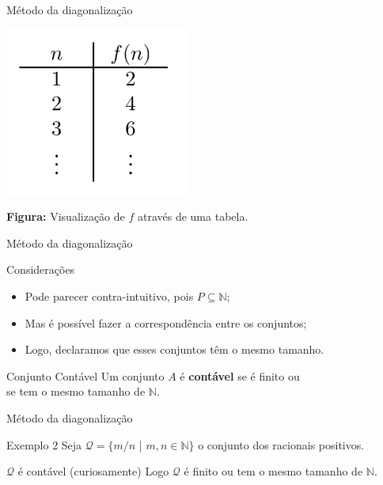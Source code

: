 \documentclass[xcolor=dvipsnames,table]{beamer}
\begin{document}
	\begin{frame}{Método da diagonalização}
		\begin{center}
    		\includegraphics[width=6cm]{images/fn2n.png}
    		
    		{\bf Figura:} Visualização de $f$ através de uma tabela.
  		\end{center}
	\end{frame}
	
	\begin{frame}{Método da diagonalização}
		\begin{block}{Considerações}
			\begin{itemize}
				\item Pode parecer contra-intuitivo, pois $P \subseteq \mathbb{N}$;
				\item Mas é possível fazer a correspondência entre os conjuntos;
				\item Logo, declaramos que esses conjuntos têm o mesmo tamanho.			
			\end{itemize}
		\end{block} 
		\begin{block}{Conjunto Contável}
			Um conjunto $A$ é {\bf contável} se é finito ou \\se tem o mesmo tamanho de $\mathbb{N}$.
		\end{block}
	\end{frame}
	
	\begin{frame}{Método da diagonalização}
		\begin{block}{Exemplo 2}
			Seja $\mathcal{Q} = \{ m / n$ | $m, n \in \mathbb{N} \}$ o conjunto dos racionais positivos.
		\end{block} 
		\begin{block}{$\mathcal{Q}$ é contável (curiosamente)} 
			Logo $\mathcal{Q}$ é finito ou tem o mesmo tamanho de $\mathbb{N}$.
		\end{block}
	\end{frame}
	
\end{document}
